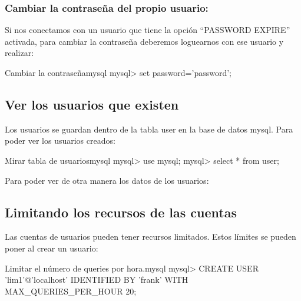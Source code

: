 \subsubsection*{Cambiar la contraseña del propio usuario:}
Si nos conectamos con un usuario que tiene la opción “PASSWORD EXPIRE” activada, para cambiar la contraseña deberemos loguearnos con ese usuario y realizar:

\begin{mycode}{Cambiar la contraseña}{mysql}{}
mysql> set password='password';
\end{mycode}


\subsection{Ver los usuarios que existen}
Los usuarios se guardan dentro de la tabla user en la base de datos mysql. Para poder ver los usuarios creados:

\begin{mycode}{Mirar tabla de usuarios}{mysql}{}
mysql> use mysql;
mysql> select * from user;
\end{mycode}


Para poder ver de otra manera los datos de los usuarios:




\subsection{Limitando los recursos de las cuentas}
Las cuentas de usuarios pueden tener recursos limitados. Estos límites se pueden poner al crear un usuario:

\begin{mycode}{Limitar el número de queries por hora.}{mysql}{\scriptsize}
mysql> CREATE USER 'lim1'@'localhost' IDENTIFIED BY 'frank' WITH MAX_QUERIES_PER_HOUR 20;
\end{mycode}


